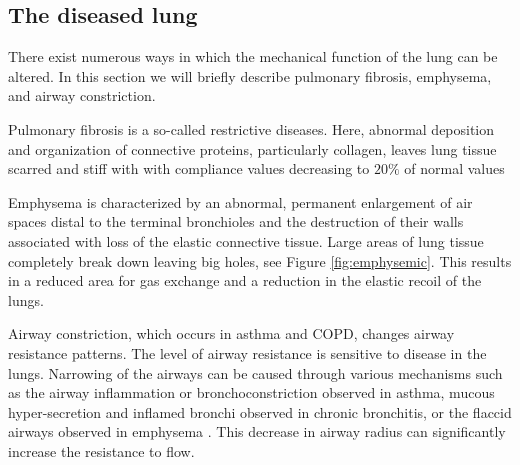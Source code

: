 \subsection{The diseased lung}
There exist numerous ways in which the mechanical function of the lung can be altered. In this section we will briefly describe pulmonary fibrosis, emphysema, and airway constriction.


Pulmonary fibrosis is a so-called restrictive diseases. Here, abnormal deposition and organization of connective proteins, particularly collagen, leaves lung tissue scarred and stiff with with compliance values decreasing to $20\%$ of normal values \citep{bates2009lung,cotes2009lung}


Emphysema is characterized by an abnormal, permanent enlargement of air spaces distal to the terminal bronchioles and the destruction of their walls associated with loss of the elastic connective tissue. Large areas of lung tissue completely break down leaving big holes, see Figure \ref{fig:emphysemic}. This results in a reduced area for gas exchange and a reduction in the elastic recoil of the lungs. 

Airway constriction, which occurs in asthma and COPD, changes airway resistance patterns. The level of airway resistance is sensitive to disease in the lungs. Narrowing of the airways can be caused through various mechanisms such as the airway inflammation or bronchoconstriction observed in asthma, mucous hyper-secretion and inflamed bronchi observed in chronic bronchitis, or the flaccid airways observed in emphysema \citep{HedgesThesis}. This decrease in airway radius can significantly increase the resistance to flow.







